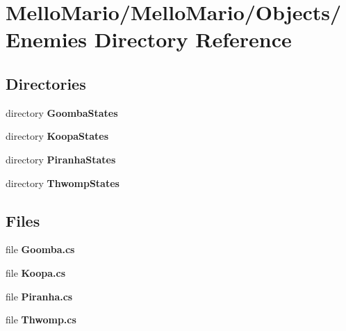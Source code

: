\section{Mello\+Mario/\+Mello\+Mario/\+Objects/\+Enemies Directory Reference}
\label{dir_9afec80c16326056639e58504dd19034}
\subsection*{Directories}
\begin{DoxyCompactItemize}
\item 
directory \textbf{ Goomba\+States}
\item 
directory \textbf{ Koopa\+States}
\item 
directory \textbf{ Piranha\+States}
\item 
directory \textbf{ Thwomp\+States}
\end{DoxyCompactItemize}
\subsection*{Files}
\begin{DoxyCompactItemize}
\item 
file \textbf{ Goomba.\+cs}
\item 
file \textbf{ Koopa.\+cs}
\item 
file \textbf{ Piranha.\+cs}
\item 
file \textbf{ Thwomp.\+cs}
\end{DoxyCompactItemize}
